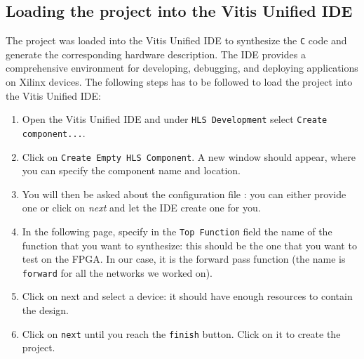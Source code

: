 \documentclass{article}
\begin{document}
\subsection{Loading the project into the Vitis Unified IDE}
The project was loaded into the Vitis Unified IDE to synthesize the \texttt{C} code and generate the corresponding hardware description. The IDE provides a comprehensive environment for developing, debugging, and deploying applications on Xilinx devices. The following steps has to be followed to load the project into the Vitis Unified IDE:
\begin{enumerate}
    \item Open the Vitis Unified IDE and under \texttt{HLS Development} select \texttt{Create component...}.
    \item Click on \texttt{Create Empty HLS Component}. A new window should appear, where you can specify the component name and location.
    \item You will then be asked about the configuration file : you can either provide one or click on \textit{next} and let the IDE create one for you.
    \item In the following page, specify in the \texttt{Top Function} field the name of the function that you want to synthesize: this should be the one that you want to test on the FPGA. In our case, it is the forward pass function (the name is \texttt{forward} for all the networks we worked on).
    \item  Click on next and select a device: it should have enough resources to contain the design.
    \item Click on \texttt{next} until you reach the \texttt{finish} button. Click on it to create the project.
\end{enumerate}
\end{document}
